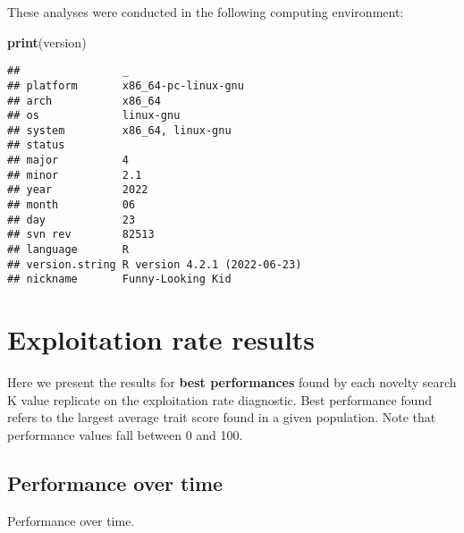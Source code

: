 \documentclass[]{book}
\newenvironment{Shaded}{\begin{snugshade}}{\end{snugshade}}
\newcommand{\DataTypeTok}[1]{\textcolor[rgb]{0.13,0.29,0.53}{#1}}
\newcommand{\KeywordTok}[1]{\textcolor[rgb]{0.13,0.29,0.53}{\textbf{#1}}}
\newcommand{\NormalTok}[1]{#1}
\newcommand{\OperatorTok}[1]{\textcolor[rgb]{0.81,0.36,0.00}{\textbf{#1}}}
\newcommand{\StringTok}[1]{\textcolor[rgb]{0.31,0.60,0.02}{#1}}
\begin{document}
These analyses were conducted in the following computing environment:

\begin{Shaded}
\begin{Highlighting}[]
\KeywordTok{print}\NormalTok{(version)}
\end{Highlighting}
\end{Shaded}

\begin{verbatim}
##                _                           
## platform       x86_64-pc-linux-gnu         
## arch           x86_64                      
## os             linux-gnu                   
## system         x86_64, linux-gnu           
## status                                     
## major          4                           
## minor          2.1                         
## year           2022                        
## month          06                          
## day            23                          
## svn rev        82513                       
## language       R                           
## version.string R version 4.2.1 (2022-06-23)
## nickname       Funny-Looking Kid
\end{verbatim}

\hypertarget{exploitation-rate-results-6}{%
\section{Exploitation rate results}\label{exploitation-rate-results-6}}

Here we present the results for \textbf{best performances} found by each novelty search K value replicate on the exploitation rate diagnostic.
Best performance found refers to the largest average trait score found in a given population.
Note that performance values fall between 0 and 100.

\hypertarget{performance-over-time-17}{%
\subsection{Performance over time}\label{performance-over-time-17}}

Performance over time.

\begin{Shaded}
\end{Shaded}
\end{document}
